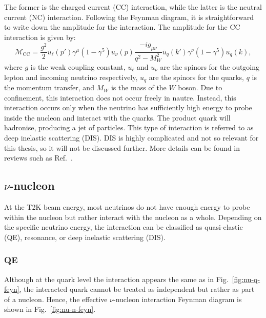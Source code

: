 The former is the charged current (CC) interaction, while the latter is the neutral current (NC) interaction.
Following the Feynman diagram, it is straightforward to write down the amplitude for the interaction.
The amplitude for the CC interaction is given by:
\begin{equation}
  \mathcal{M}_{\text{CC}} = \frac{g^2}{2} \bar{u}_\ell(p') \gamma^\mu (1 - \gamma^5) u_\nu(p) \frac{-i g_{\mu\nu}}{q^2 - M_W^2} \bar{u}_q(k') \gamma^\nu (1 - \gamma^5) u_q(k),
\end{equation}
where $g$ is the weak coupling constant, $u_\ell$ and $u_\nu$ are the spinors for the outgoing lepton and incoming neutrino respectively, $u_q$ are the spinors for the quarks, $q$ is the momentum transfer, and $M_W$ is the mass of the $W$ boson.
Due to confinement, this interaction does not occur freely in nautre.
Instead, this interaction occurs only when the neutrino has sufficiently high energy to probe inside the nucleon and interact with the quarks.
The product quark will hadronise, producing a jet of particles.
This type of interaction is referred to as deep inelastic scattering (DIS).
DIS is highly complicated and not so relevant for this thesis, so it will not be discussed further.
More details can be found in reviews such as Ref.~\cite{SajjadAthar:2022pjt}.

\subsection{$\nu$-nucleon}
At the T2K beam energy, most neutrinos do not have enough energy to probe within the nucleon but rather interact with the nucleon as a whole.
Depending on the specific neutrino energy, the interaction can be classified as quasi-elastic (QE), resonance, or deep inelastic scattering (DIS).

\subsubsection{QE}
Although at the quark level the interaction appears the same as in Fig.~\ref{fig:nu-q-feyn}, the interacted quark cannot be treated as independent but rather as part of a nucleon.
Hence, the effective $\nu$-nucleon interaction Feynman diagram is shown in Fig.~\ref{fig:nu-n-feyn}.

